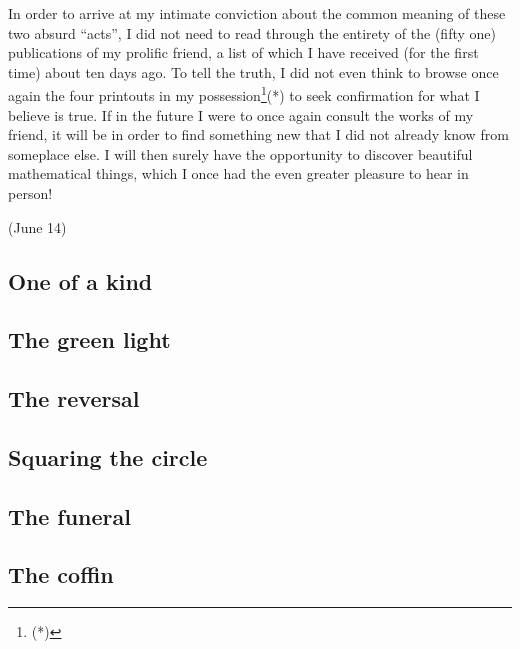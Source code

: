 In order to arrive at my intimate conviction about the common meaning of these two absurd
``acts'', I did not need to read through the entirety of the (fifty one) publications of
my prolific friend, a list of which I have received (for the first time) about ten days
ago. 
To tell the truth, I did not even think to browse once again the four printouts in my
possession\footnote{(*)}(*) to seek confirmation for what I believe is true. If in the
future I were to once again consult the works of my friend, it will be 
in order to find something new that I did not already know from someplace else. 
I will then surely have the opportunity to discover beautiful mathematical things, which I
once had the even greater pleasure to hear in person!


(June 14)

\subsection{One of a kind}


\subsection{The green light}


\subsection{The reversal}


\subsection{Squaring the circle}


\subsection{The funeral}


\subsection{The coffin}



